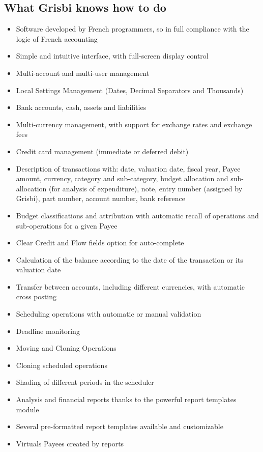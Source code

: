 \subsection{What Grisbi knows how to do}

\begin{itemize}
	\item Software developed by French programmers, so in full compliance with the logic of French accounting
	\item Simple and intuitive interface, with full-screen display control
	\item Multi-account and multi-user management
	\item Local Settings Management (Dates, Decimal Separators and Thousands)
	\item Bank accounts, cash, assets and liabilities
	\item Multi-currency management, with support for exchange rates and exchange fees
	\item Credit card management (immediate or deferred debit)
	\item Description of transactions with: date, valuation date, fiscal year, Payee amount, currency, category and sub-category, budget allocation and sub-allocation (for analysis of expenditure), note, entry number (assigned by Grisbi), part number, account number, bank reference
	\item Budget classifications and attribution with automatic recall of operations and sub-operations for a given Payee
	\item Clear Credit and Flow fields option for auto-complete
	\item Calculation of the balance according to the date of the transaction or its valuation date
	\item Transfer between accounts, including different currencies, with automatic cross posting
	\item Scheduling operations with automatic or manual validation
	\item Deadline monitoring
	\item Moving and Cloning Operations
	\item Cloning scheduled operations
	\item Shading of different periods in the scheduler
	\item Analysis and financial reports thanks to the powerful report templates module
	\item Several pre-formatted report templates available and customizable
	\item Virtuals Payees created by reports

\end{itemize}
